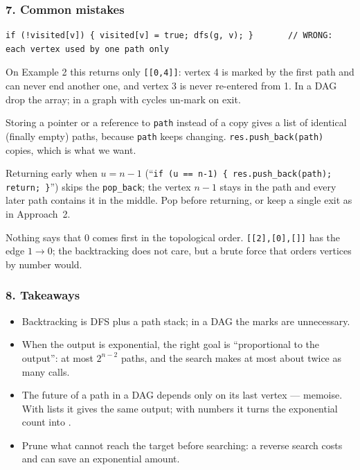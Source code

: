 \subsubsection*{7. Common mistakes}

\begin{warningbox}
\begin{lstlisting}[style=snippet]
if (!visited[v]) { visited[v] = true; dfs(g, v); }       // WRONG: each vertex used by one path only
\end{lstlisting}
On Example 2 this returns only \texttt{[[0,4]]}: vertex 4 is marked by the first path and can never end another one, and vertex 3 is never re-entered from 1. In a DAG drop the array; in a graph with cycles un-mark on exit.
\end{warningbox}

\begin{warningbox}
Storing a pointer or a reference to \texttt{path} instead of a copy gives a list of identical (finally empty) paths, because \texttt{path} keeps changing. \texttt{res.push\_back(path)} copies, which is what we want.
\end{warningbox}

\begin{warningbox}
Returning early when $u = n-1$ (``\texttt{if (u == n-1) \{ res.push\_back(path); return; \}}'') skips the \texttt{pop\_back}; the vertex $n-1$ stays in the path and every later path contains it in the middle. Pop before returning, or keep a single exit as in Approach~2.
\end{warningbox}

\begin{warningbox}
Nothing says that 0 comes first in the topological order. \texttt{[[2],[0],[]]} has the edge $1 \to 0$; the backtracking does not care, but a brute force that orders vertices by number would.
\end{warningbox}

\subsubsection*{8. Takeaways}

\begin{itemize}[leftmargin=*]
    \item Backtracking is DFS plus a path stack; in a DAG the marks are unnecessary.
    \item When the output is exponential, the right goal is ``proportional to the output'': at most $2^{n-2}$ paths, and the search makes at most about twice as many calls.
    \item The future of a path in a DAG depends only on its last vertex --- memoise. With lists it gives the same output; with numbers it turns the exponential count into \VE.
    \item Prune what cannot reach the target before searching: a reverse search costs \VE{} and can save an exponential amount.
\end{itemize}

